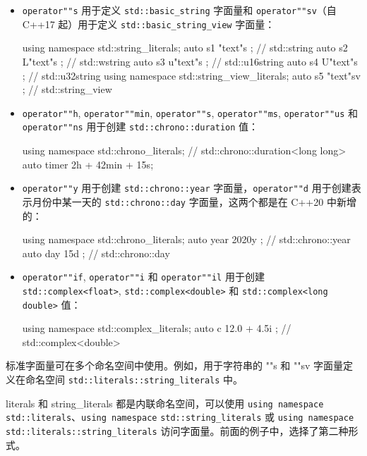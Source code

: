 \begin{itemize}
\item
\verb|operator""s| 用于定义 \verb|std::basic_string| 字面量和 \verb|operator""sv|（自 C++17 起）用于定义 \verb|std::basic_string_view| 字面量：

\begin{cpp}
using namespace std::string_literals;
auto s1{  "text"s }; // std::string
auto s2{ L"text"s }; // std::wstring
auto s3{ u"text"s }; // std::u16string
auto s4{ U"text"s }; // std::u32string
using namespace std::string_view_literals;
auto s5{ "text"sv }; // std::string_view
\end{cpp}

\item
\verb|operator""h|, \verb|operator""min|, \verb|operator""s|, \verb|operator""ms|, \verb|operator""us| 和 \verb|operator""ns| 用于创建 \verb|std::chrono::duration| 值：

\begin{cpp}
using namespace std::chrono_literals;
// std::chrono::duration<long long>
auto timer {2h + 42min + 15s};
\end{cpp}

\item
\verb|operator""y| 用于创建 \verb|std::chrono::year| 字面量，\verb|operator""d| 用于创建表示月份中某一天的 \verb|std::chrono::day| 字面量，这两个都是在 C++20 中新增的：

\begin{cpp}
using namespace std::chrono_literals;
auto year { 2020y }; // std::chrono::year
auto day { 15d };    // std::chrono::day
\end{cpp}

\item
\verb|operator""if|, \verb|operator""i| 和 \verb|operator""il| 用于创建 \verb|std::complex<float>|, \verb|std::complex<double>| 和 \verb|std::complex<long double>| 值：

\begin{cpp}
using namespace std::complex_literals;
auto c{ 12.0 + 4.5i }; // std::complex<double>
\end{cpp}
\end{itemize}

标准字面量可在多个命名空间中使用。例如，用于字符串的 ""s 和 ""sv 字面量定义在命名空间 \verb|std::literals::string_literals| 中。

literals 和 string\_literals 都是内联命名空间，可以使用 \verb|using namespace| \verb|std::literals|、\verb|using namespace| \verb|std::string_literals| 或 \verb|using namespace| \verb|std::literals::string_literals| 访问字面量。前面的例子中，选择了第二种形式。















